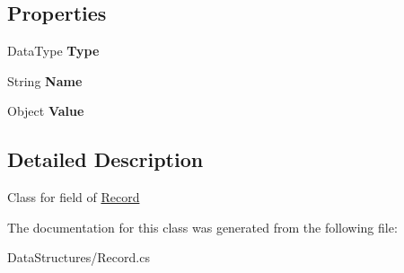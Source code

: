 \subsection*{Properties}
\begin{DoxyCompactItemize}
\item 
\hypertarget{class_dwarf_d_b_1_1_data_structures_1_1_field_a147e0dff27a89485bf91437d931fe5b5}{Data\+Type {\bfseries Type}}\label{class_dwarf_d_b_1_1_data_structures_1_1_field_a147e0dff27a89485bf91437d931fe5b5}

\item 
\hypertarget{class_dwarf_d_b_1_1_data_structures_1_1_field_a5c1af79be209e13f5da11e4c033f1fdb}{String {\bfseries Name}}\label{class_dwarf_d_b_1_1_data_structures_1_1_field_a5c1af79be209e13f5da11e4c033f1fdb}

\item 
\hypertarget{class_dwarf_d_b_1_1_data_structures_1_1_field_ac7d7ebd43b9010ed2a7767a296e90d6f}{Object {\bfseries Value}}\label{class_dwarf_d_b_1_1_data_structures_1_1_field_ac7d7ebd43b9010ed2a7767a296e90d6f}

\end{DoxyCompactItemize}


\subsection{Detailed Description}
Class for field of \hyperlink{class_dwarf_d_b_1_1_data_structures_1_1_record}{Record} 



The documentation for this class was generated from the following file\+:\begin{DoxyCompactItemize}
\item 
Data\+Structures/Record.\+cs\end{DoxyCompactItemize}
